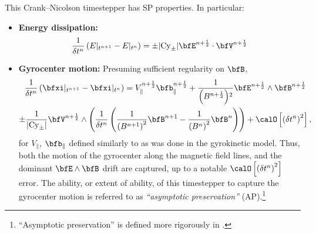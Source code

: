     This Crank--Nicolson timestepper has SP properties. In particular:
    \begin{itemize}
        \item  {\bf Energy dissipation:}
        \begin{equation}
            \frac{1}{\delta t^{n}}\left(E|_{t^{n + 1}} - E|_{t^{n}}\right)
                =  \pm |\rmCy_{\pm}|\bfE^{n + \frac{1}{2}}\cdot\bfV^{n + \frac{1}{2}}
        \end{equation}
        \item  {\bf Gyrocenter motion:} Presuming sufficient regularity on $\bfB$,
        \begin{multline}
            \frac{1}{\delta t^{n}}\left(\bfxi|_{t^{n + 1}} - \bfxi|_{t^{n}}\right)
                =  V_{\parallel}^{n + \frac{1}{2}}\bfb_{\parallel}^{n + \frac{1}{2}}
                + \frac{1}{\left(B^{n + \frac{1}{2}}\right)\!^{2}}\bfE^{n + \frac{1}{2}}\wedge\bfB^{n + \frac{1}{2}}  \\
                \pm \frac{1}{|\rmCy_{\pm}|}\bfV^{n + \frac{1}{2}}\wedge\left(\frac{1}{\delta t^{n}}\left(\frac{1}{\left(B^{n + 1}\right)^{2}}\bfB^{n + 1} - \frac{1}{\left(B^{n}\right)^{2}}\bfB^{n}\right)\right) + \calO\left[\left(\delta t^{n}\right)^{2}\right],
        \end{multline}
        for $V_{\parallel}$, $\bfb_{\parallel}$ defined similarly to as was done in the gyrokinetic model. Thus, both the motion of the gyrocenter along the magnetic field lines, and the dominant $\bfE\wedge\bfB$ drift are captured, up to a notable $\calO\left[\left(\delta t^{n}\right)^{2}\right]$ error. The ability, or extent of ability, of this timestepper to capture the gyrocenter motion is referred to as \emph{``asymptotic preservation''} (AP).\footnote{``Asymptotic preservation'' is defined more rigorously in \cite{Ricketson_Chacón_2020}.}
    \end{itemize}

    \shortline

